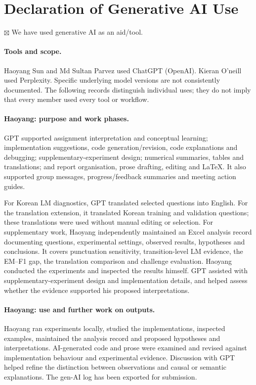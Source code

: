 \documentclass[11pt]{article}
\begin{document}
\section{Declaration of Generative AI Use}
\noindent $\boxtimes$ We have used generative AI as an aid/tool.

\paragraph{Tools and scope.}
Haoyang Sun and Md Sultan Parvez used ChatGPT (OpenAI). Kieran O'neill used Perplexity. Specific underlying model versions are not consistently documented. The following records distinguish individual uses; they do not imply that every member used every tool or workflow.

\paragraph{Haoyang: purpose and work phases.}
GPT supported assignment interpretation and conceptual learning; implementation suggestions, code generation/revision, code explanations and debugging; supplementary-experiment design; numerical summaries, tables and translations; and report organisation, prose drafting, editing and LaTeX. It also supported group messages, progress/feedback summaries and meeting action guides.

For Korean LM diagnostics, GPT translated selected questions into English. For the translation extension, it translated Korean training and validation questions; these translations were used without manual editing or selection. For supplementary work, Haoyang independently maintained an Excel analysis record documenting questions, experimental settings, observed results, hypotheses and conclusions. It covers punctuation sensitivity, transition-level LM evidence, the EM--F1 gap, the translation comparison and challenge evaluation. Haoyang conducted the experiments and inspected the results himself. GPT assisted with supplementary-experiment design and implementation details, and helped assess whether the evidence supported his proposed interpretations. 

\paragraph{Haoyang: use and further work on outputs.}
Haoyang ran experiments locally, studied the implementations, inspected examples, maintained the analysis record and proposed hypotheses and interpretations. AI-generated code and prose were examined and revised against implementation behaviour and experimental evidence. Discussion with GPT helped refine the distinction between observations and causal or semantic explanations. The gen-AI log has been exported for submission.
\end{document}
